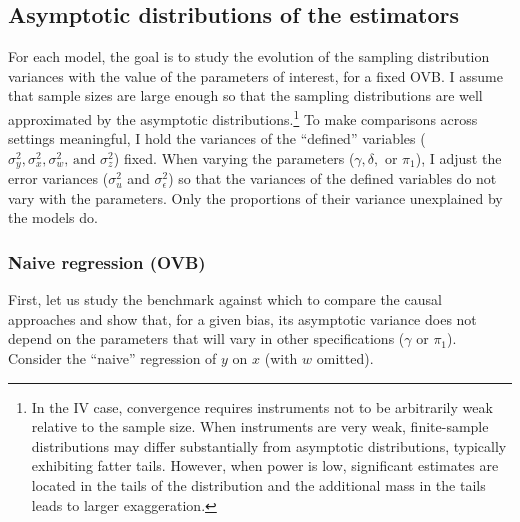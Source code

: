 \documentclass[usletter, 12pt]{article}
\begin{document}
				
		
		\subsection{Asymptotic distributions of the estimators}\label{maths_asymptotics}			 
			
			For each model, the goal is to study the evolution of the sampling distribution variances with the value of the parameters of interest, for a fixed OVB. %
			I assume that sample sizes are large enough so that the sampling distributions are well approximated by the asymptotic distributions.\footnote{In the IV case, convergence requires instruments not to be arbitrarily weak relative to the sample size. When instruments are very weak, finite-sample distributions may differ substantially from asymptotic distributions, typically exhibiting fatter tails. However, when power is low, significant estimates are located in the tails of the distribution and the additional mass in the tails leads to larger exaggeration.} To make comparisons across settings meaningful, I hold the variances of the ``defined'' variables ($\sigma_{y}^{2}, \sigma_{x}^{2}, \sigma_{w}^{2}\text{, and } \sigma_{z}^{2}$) fixed. When varying the parameters ($\gamma, \delta,$ or $\pi_{1}$), I adjust the error variances ($\sigma_{u}^{2}$ and $\sigma_{\epsilon}^{2}$) so that the variances of the defined variables do not vary with the parameters. Only the proportions of their variance unexplained by the models do.
						

			\subsubsection{Naive regression (OVB)}\label{formal_proof_ovb}
			
				First, let us study the benchmark against which to compare the causal approaches and show that, for a given bias, its asymptotic variance does not depend on the parameters that will vary in other specifications ($\gamma$ or $\pi_1$). Consider the ``naive'' regression of $y$ on $x$ (with $w$ omitted). 
						
\end{document}
